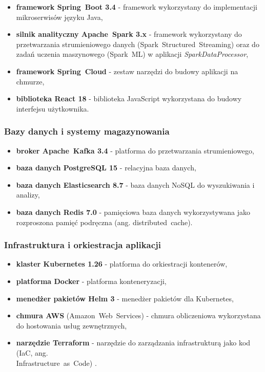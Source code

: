 \begin{itemize}
    \item \textbf{framework \mbox{Spring Boot} 3.4} - framework wykorzystany do implementacji mikroserwisów języku Java,
    \item \textbf{silnik analityczny \mbox{Apache Spark} 3.x} \cite{spark_streaming} - framework wykorzystany do przetwarzania strumieniowego danych (\mbox{Spark Structured Streaming}) \cite{chambers2018spark} oraz do zadań uczenia maszynowego (\mbox{Spark ML}) w aplikacji \mbox{\textit{SparkDataProcessor}},
    \item \textbf{framework \mbox{Spring Cloud}} - zestaw narzędzi do budowy aplikacji na chmurze,
    \item \textbf{biblioteka React 18} - biblioteka JavaScript wykorzystana do budowy interfejsu użytkownika.
\end{itemize}

\subsubsection{Bazy danych i systemy magazynowania}
\label{subsubsec:bazy_danych}

\begin{itemize}
    \item \textbf{broker \mbox{Apache Kafka} 3.4} \cite{kafka} - platforma do przetwarzania strumieniowego,
    \item \textbf{baza danych PostgreSQL 15} - relacyjna baza danych,
    \item \textbf{baza danych Elasticsearch 8.7} - baza danych \mbox{NoSQL} \cite{nosql_definition} do wyszukiwania i analizy,
    \item \textbf{baza danych Redis 7.0} - pamięciowa baza danych wykorzystywana jako rozproszona pamięć podręczna (ang. \mbox{distributed cache}).
\end{itemize}

\subsubsection{Infrastruktura i orkiestracja aplikacji}
\label{subsubsec:infrastruktura}

\begin{itemize}
    \item \textbf{klaster Kubernetes 1.26} \cite{kubernetes} - platforma do orkiestracji kontenerów,
    \item \textbf{platforma Docker} - platforma konteneryzacji,
    \item \textbf{menedżer pakietów Helm 3} - menedżer pakietów dla Kubernetes,
    \item \textbf{chmura AWS} (\mbox{Amazon Web Services}) \cite{aws_definition} - chmura obliczeniowa wykorzystana do hostowania usług zewnętrznych,
    \item \textbf{narzędzie Terraform} - narzędzie do zarządzania infrastrukturą jako kod (IaC, ang. \\ \mbox{Infrastructure as Code}) \cite{terraform_docs}.
\end{itemize}

